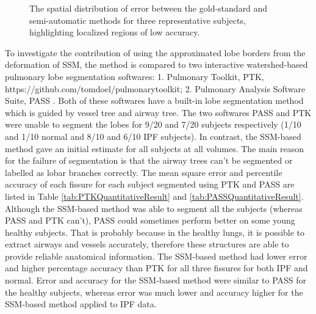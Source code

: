 \documentclass[]{spie}  %
\begin{document}
{\begin{figure}[htbp]
\begin{subfigure}
{\begin{minipage}[t]{0.26\linewidth}
  \centerline{}
	\end{minipage}%
   }%
  \label{fig:QuanlititativeResult-c} 
\end{subfigure}
\caption{The spatial distribution of error between the gold-standard and semi-automatic methods for three representative subjects, highlighting localized regions of low accuracy.}
\label{fig:QuanlititativeResult}
\end{figure}

To investigate the contribution of using the approximated lobe borders from the deformation of SSM, the method is compared to two interactive watershed-based pulmonary lobe segmentation softwares: 1. Pulmonary Toolkit, PTK, https://github.com/tomdoel/pulmonarytoolkit; 2. Pulmonary Analysis Software Suite, PASS \cite{guo2008pulmonary}. Both of these softwares have a built-in lobe segmentation method which is guided by vessel tree and airway tree. The two softwares PASS and PTK were unable to segment the lobes for 9/20 and 7/20 subjects respectively (1/10 and 1/10 normal and 8/10 and 6/10 IPF subjects). In contrast, the SSM-based method gave an initial estimate for all subjects at all volumes. The main reason for the failure of segmentation is that the airway trees can't be segmented or labelled as lobar branches correctly. The mean square error and percentile accuracy of each fissure for each subject segmented using PTK and PASS are listed in Table \ref{tab:PTKQuantitativeResult} and \ref{tab:PASSQuantitativeResult}. Although the SSM-based method was able to segment all the subjects (whereas PASS and PTK can't), PASS could sometimes perform better on some young healthy subjects. That is probably because in the healthy lungs, it is possible to extract airways and vessels accurately, therefore these structures are able to provide reliable anatomical information. The SSM-based method had lower error and higher percentage accuracy than PTK for all three fissures for both IPF and normal. Error and accuracy for the SSM-based method were similar to PASS for the healthy subjects, whereas error was much lower and accuracy higher for the SSM-based method applied to IPF data.

}
\end{document}
